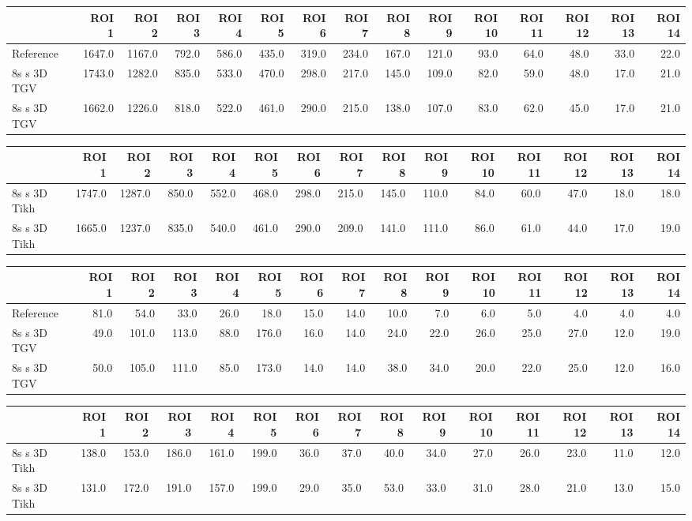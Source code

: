 \begin{tabular}{lrrrrrrrrrrrrrr}
\toprule
{} &   ROI 1 &   ROI 2 &  ROI 3 &  ROI 4 &  ROI 5 &  ROI 6 &  ROI 7 &  ROI 8 &  ROI 9 &  ROI 10 &  ROI 11 &  ROI 12 &  ROI 13 &  ROI 14 \\
\midrule
Reference   &  1647.0 &  1167.0 &  792.0 &  586.0 &  435.0 &  319.0 &  234.0 &  167.0 &  121.0 &    93.0 &    64.0 &    48.0 &    33.0 &    22.0 \\
8s s 3D TGV &  1743.0 &  1282.0 &  835.0 &  533.0 &  470.0 &  298.0 &  217.0 &  145.0 &  109.0 &    82.0 &    59.0 &    48.0 &    17.0 &    21.0 \\
8s s 3D TGV &  1662.0 &  1226.0 &  818.0 &  522.0 &  461.0 &  290.0 &  215.0 &  138.0 &  107.0 &    83.0 &    62.0 &    45.0 &    17.0 &    21.0 \\
\bottomrule
\end{tabular}
\begin{tabular}{lrrrrrrrrrrrrrr}
\toprule
{} &   ROI 1 &   ROI 2 &  ROI 3 &  ROI 4 &  ROI 5 &  ROI 6 &  ROI 7 &  ROI 8 &  ROI 9 &  ROI 10 &  ROI 11 &  ROI 12 &  ROI 13 &  ROI 14 \\
\midrule
8s s 3D Tikh &  1747.0 &  1287.0 &  850.0 &  552.0 &  468.0 &  298.0 &  215.0 &  145.0 &  110.0 &    84.0 &    60.0 &    47.0 &    18.0 &    18.0 \\
8s s 3D Tikh &  1665.0 &  1237.0 &  835.0 &  540.0 &  461.0 &  290.0 &  209.0 &  141.0 &  111.0 &    86.0 &    61.0 &    44.0 &    17.0 &    19.0 \\
\bottomrule
\end{tabular}
\begin{tabular}{lrrrrrrrrrrrrrr}
\toprule
{} &  ROI 1 &  ROI 2 &  ROI 3 &  ROI 4 &  ROI 5 &  ROI 6 &  ROI 7 &  ROI 8 &  ROI 9 &  ROI 10 &  ROI 11 &  ROI 12 &  ROI 13 &  ROI 14 \\
\midrule
Reference   &   81.0 &   54.0 &   33.0 &   26.0 &   18.0 &   15.0 &   14.0 &   10.0 &    7.0 &     6.0 &     5.0 &     4.0 &     4.0 &     4.0 \\
8s s 3D TGV &   49.0 &  101.0 &  113.0 &   88.0 &  176.0 &   16.0 &   14.0 &   24.0 &   22.0 &    26.0 &    25.0 &    27.0 &    12.0 &    19.0 \\
8s s 3D TGV &   50.0 &  105.0 &  111.0 &   85.0 &  173.0 &   14.0 &   14.0 &   38.0 &   34.0 &    20.0 &    22.0 &    25.0 &    12.0 &    16.0 \\
\bottomrule
\end{tabular}
\begin{tabular}{lrrrrrrrrrrrrrr}
\toprule
{} &  ROI 1 &  ROI 2 &  ROI 3 &  ROI 4 &  ROI 5 &  ROI 6 &  ROI 7 &  ROI 8 &  ROI 9 &  ROI 10 &  ROI 11 &  ROI 12 &  ROI 13 &  ROI 14 \\
\midrule
8s s 3D Tikh &  138.0 &  153.0 &  186.0 &  161.0 &  199.0 &   36.0 &   37.0 &   40.0 &   34.0 &    27.0 &    26.0 &    23.0 &    11.0 &    12.0 \\
8s s 3D Tikh &  131.0 &  172.0 &  191.0 &  157.0 &  199.0 &   29.0 &   35.0 &   53.0 &   33.0 &    31.0 &    28.0 &    21.0 &    13.0 &    15.0 \\
\bottomrule
\end{tabular}
